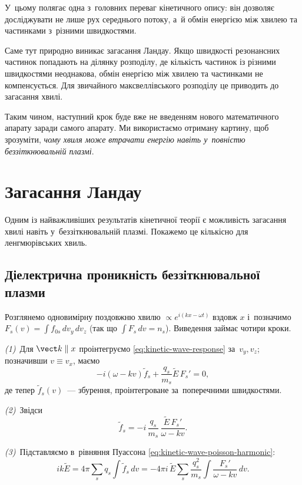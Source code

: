 У~цьому полягає одна з~головних переваг кінетичного опису: він дозволяє досліджувати
не лише рух середнього потоку, а~й обмін енергією між хвилею та частинками з~різними
швидкостями.

Саме тут природно виникає загасання Ландау. Якщо швидкості резонансних частинок
попадають на ділянку розподілу, де кількість частинок із різними швидкостями неоднакова,
обмін енергією між хвилею та частинками не компенсується. Для звичайного
максвеллівського розподілу це приводить до загасання хвилі.

Таким чином, наступний крок буде вже не введенням нового математичного апарату заради
самого апарату. Ми використаємо отриману картину, щоб зрозуміти, \emph{чому хвиля може
втрачати енергію навіть у~повністю беззіткнювальній плазмі}.

\section{Загасання Ландау}\label{sec:landau-damping}

Одним із найважливіших результатів кінетичної теорії є можливість загасання хвилі навіть
у~беззіткнювальній плазмі. Покажемо це кількісно для ленгмюрівських хвиль.

\subsection*{Діелектрична проникність беззіткнювальної плазми}
Розглянемо одновимірну поздовжню хвилю $\propto e^{i(kx-\omega t)}$ вздовж $x$ і~позначимо
$F_{s}(v)=\int f_{0s}\,dv_y\,dv_z$ (так що $\int F_s\,dv=n_s$). Виведення займає чотири кроки.

\emph{(1)}~Для $\vect k\parallel x$ проінтегруємо \eqref{eq:kinetic-wave-response} за~$v_y,v_z$; позначивши $v\equiv v_x$, маємо
\[
-i(\omega-kv)\widetilde f_s+\frac{q_s}{m_s}\widetilde E\,F_s'=0,
\]
де тепер $\widetilde f_s(v)$~--- збурення, проінтегроване за~поперечними швидкостями.

\emph{(2)}~Звідси
\[
\widetilde f_s=-i\,\frac{q_s}{m_s}\,\frac{\widetilde E\,F_s'}{\omega-kv}.
\]

\emph{(3)}~Підставляємо в~рівняння Пуассона \eqref{eq:kinetic-wave-poisson-harmonic}:
\[
ik\widetilde E=4\pi\sum_sq_s\int\widetilde f_s\,dv
=-4\pi i\,\widetilde E\sum_s\frac{q_s^2}{m_s}\int\frac{F_s'}{\omega-kv}\,dv.
\]

